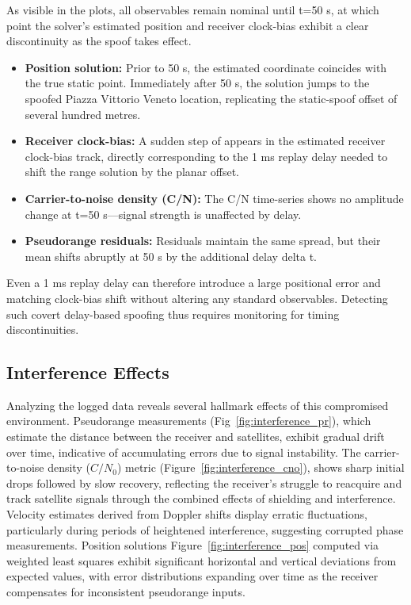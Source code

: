         \noindent As visible in the plots, all observables remain nominal until t=50 s, at which point the solver's estimated position and receiver clock-bias exhibit a clear discontinuity as the spoof takes effect.

        \begin{itemize}
            \item \textbf{Position solution:} Prior to 50 s, the estimated coordinate coincides with the true static point. Immediately after 50 s, the solution jumps to the spoofed Piazza Vittorio Veneto location, replicating the static-spoof offset of several hundred metres.  
            \item \textbf{Receiver clock-bias:} A sudden step of appears in the estimated receiver clock-bias track, directly corresponding to the 1 ms replay delay needed to shift the range solution by the planar offset.  
            \item \textbf{Carrier-to-noise density (C/N):} The C/N time-series shows no amplitude change at t=50 s—signal strength is unaffected by delay.  
            \item \textbf{Pseudorange residuals:} Residuals maintain the same spread, but their mean shifts abruptly at 50 s by the additional delay delta t.  
        \end{itemize}
        
        \noindent Even a 1 ms replay delay can therefore introduce a large positional error and matching clock-bias shift without altering any standard observables. Detecting such covert delay-based spoofing thus requires monitoring for timing discontinuities.

    \subsection{Interference Effects}
    

        \noindent

        Analyzing the logged data reveals several hallmark effects of this compromised environment. 
        Pseudorange measurements (Fig~\ref{fig:interference_pr}), which estimate the distance between the receiver and satellites, exhibit gradual drift over time, indicative of accumulating errors due to signal instability. 
        The carrier-to-noise density ($C/N_0$) metric (Figure~\ref{fig:interference_cno}), shows sharp initial drops followed by slow recovery, reflecting the receiver's struggle to reacquire and track satellite signals through the combined effects of shielding and interference. 
        Velocity estimates derived from Doppler shifts display erratic fluctuations, particularly during periods of heightened interference, suggesting corrupted phase measurements. 
        Position solutions Figure~\ref{fig:interference_pos} computed via weighted least squares exhibit significant horizontal and vertical deviations from expected values, with error distributions expanding over time as the receiver compensates for inconsistent pseudorange inputs. 
        
